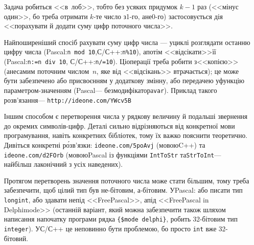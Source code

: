 \Tutorial	Задача робиться <<в~лоб>>, тобто без усяких придумок $k{-}1$ раз (<<мінус один>>, бо треба отримати \mbox{$k$-те} число з\nolinebreak[3] \mbox{1-го}, а\nolinebreak[3] не\nolinebreak[3] \mbox{0-го}) застосовується дія <<порахувати й додати суму цифр поточного числа>>. 

Найпоширеніший спосіб рахувати суму цифр числа --- у\nolinebreak[3] циклі розглядати останню цифру числа (Pascal:\nolinebreak[2] \mbox{\texttt{n~mod~10}},\linebreak[1] С/С++:\nolinebreak[2] \mbox{\texttt{n\%10}}), а\nolinebreak[3] потім <<відсікати>>\nolinebreak[2] її (Pascal:\nolinebreak[2] \mbox{\texttt{n:=n~div~10}}, С/С++:\nolinebreak[2] \mbox{\texttt{n/=10}}). Ці\nolinebreak[2] операції треба робити з\nolinebreak[3] <<копією>> (а\nolinebreak[3] не\nolinebreak[3] самим поточним числом~$n$, яке від <<відсікань>> втрачається); це може бути забезпечено або присвоєнням у додаткову змінну, або передачею у\nolinebreak[3] функцію параметром-значенням (Pascal\nolinebreak[3] --- без\nolinebreak[2] модифікатора\nolinebreak[2] \texttt{var}). Приклад такого розв'язання\nolinebreak[3] --- \verb"http://ideone.com/YWcv5B"

Іншим способом є перетворення числа у рядкову величину й подальші звернення до окремих символів-цифр. Деталі сильно відрізняються від конкретної мови програмування, навіть конкретних бібліотек, тому їх важко пояснити теоретично. Дивіться конкретні р\'{о}зв'язки: \verb"ideone.com/5poAvj" (мовою\nolinebreak[2] C++) та \verb"ideone.com/d2FOrb" (мовою\nolinebreak[1] Pascal із функціями \texttt{IntToStr} та\nolinebreak[2] \texttt{StrToInt}\nolinebreak[3] --- найбільш лаконічний з усіх наведених).

Протягом перетворень значення поточного числа може стати більшим, тому треба забезпечити, щоб цілий тип був не-бітовим, а-бітовим. У\nolinebreak[3] Pascal: або писати тип \texttt{longint}, або здавати не\nolinebreak[3] під <<Free\nolinebreak[3] Pascal>>, а\nolinebreak[3] під <<Free\nolinebreak[3] Pascal in Delphi\nolinebreak[3] mode>> (останній варіант, який можна забезпечити також шляхом написання на\nolinebreak[3] початку програми рядка \verb"{$mode delphi}", робить 32-бітовим тип \texttt{integer}). У\nolinebreak[3] С/С++ це не\nolinebreak[3] повинно бути проблемою, бо просто \texttt{int} вже 32-бітовий. 
